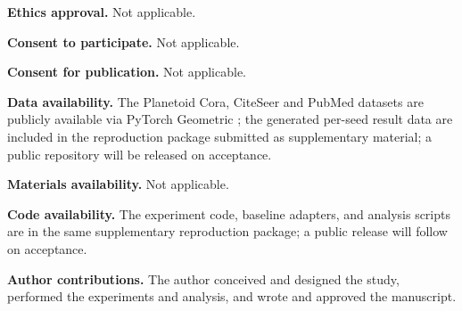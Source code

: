 \documentclass[pdflatex,sn-basic,Numbered]{sn-jnl}
\begin{document}
\textbf{Ethics approval.} Not applicable.

\textbf{Consent to participate.} Not applicable.

\textbf{Consent for publication.} Not applicable.

\textbf{Data availability.} The Planetoid Cora, CiteSeer and PubMed datasets are publicly available via PyTorch Geometric \cite{planetoid2016}; the generated per-seed result data are included in the reproduction package submitted as supplementary material; a public repository will be released on acceptance.

\textbf{Materials availability.} Not applicable.

\textbf{Code availability.} The experiment code, baseline adapters, and analysis scripts are in the same supplementary reproduction package; a public release will follow on acceptance.

\textbf{Author contributions.} The author conceived and designed the study, performed the experiments and analysis, and wrote and approved the manuscript.


\end{document}
